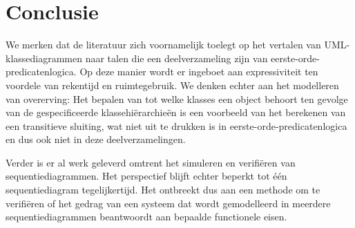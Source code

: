 \section{Conclusie}

\sloppy We merken dat de literatuur zich voornamelijk toelegt op het vertalen van UML-klassediagrammen naar talen die een deelverzameling zijn van eerste-orde-predicatenlogica. Op deze manier wordt er ingeboet aan expressiviteit ten voordele van rekentijd en ruimtegebruik. We denken echter aan het modelleren van overerving: Het bepalen van tot welke klasses een object behoort ten gevolge van de gespecificeerde klassehi\"erarchie\"en is een voorbeeld van het berekenen van een transitieve sluiting, wat niet uit te drukken is in eerste-orde-predicatenlogica en dus ook niet in deze deelverzamelingen.

Verder is er al werk geleverd omtrent het simuleren en verifi\"eren van sequentiediagrammen. Het perspectief blijft echter beperkt tot \'e\'en sequentiediagram tegelijkertijd. Het ontbreekt dus aan een methode om te verifi\"eren of het gedrag van een systeem dat wordt gemodelleerd in meerdere sequentiediagrammen beantwoordt aan bepaalde functionele eisen.